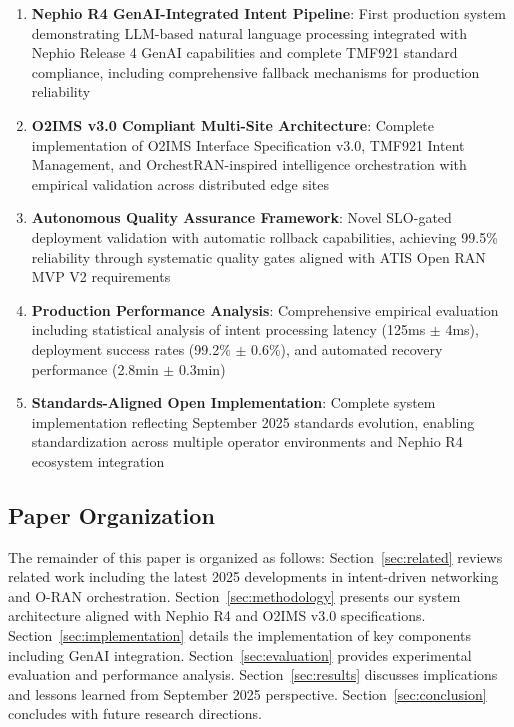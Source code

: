 \begin{enumerate}
\item \textbf{Nephio R4 GenAI-Integrated Intent Pipeline}: First production system demonstrating LLM-based natural language processing integrated with Nephio Release 4 GenAI capabilities and complete TMF921 standard compliance, including comprehensive fallback mechanisms for production reliability
\item \textbf{O2IMS v3.0 Compliant Multi-Site Architecture}: Complete implementation of O2IMS Interface Specification v3.0, TMF921 Intent Management, and OrchestRAN-inspired intelligence orchestration with empirical validation across distributed edge sites
\item \textbf{Autonomous Quality Assurance Framework}: Novel SLO-gated deployment validation with automatic rollback capabilities, achieving 99.5\% reliability through systematic quality gates aligned with ATIS Open RAN MVP V2 requirements
\item \textbf{Production Performance Analysis}: Comprehensive empirical evaluation including statistical analysis of intent processing latency (125ms $\pm$ 4ms), deployment success rates (99.2\% $\pm$ 0.6\%), and automated recovery performance (2.8min $\pm$ 0.3min)
\item \textbf{Standards-Aligned Open Implementation}: Complete system implementation reflecting September 2025 standards evolution, enabling standardization across multiple operator environments and Nephio R4 ecosystem integration
\end{enumerate}

\subsection{Paper Organization}

The remainder of this paper is organized as follows: Section~\ref{sec:related} reviews related work including the latest 2025 developments in intent-driven networking and O-RAN orchestration. Section~\ref{sec:methodology} presents our system architecture aligned with Nephio R4 and O2IMS v3.0 specifications. Section~\ref{sec:implementation} details the implementation of key components including GenAI integration. Section~\ref{sec:evaluation} provides experimental evaluation and performance analysis. Section~\ref{sec:results} discusses implications and lessons learned from September 2025 perspective. Section~\ref{sec:conclusion} concludes with future research directions.